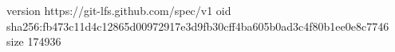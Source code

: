 version https://git-lfs.github.com/spec/v1
oid sha256:fb473c11d4c12865d00972917e3d9fb30cff4ba605b0ad3c4f80b1ee0e8c7746
size 174936
